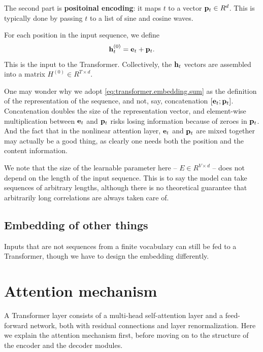 \documentclass[hyperref, a4paper, 12pt]{report}
\newcommand*{\concept}[1]{{\textbf{#1}}}
\def\mathbb#1{#1}%
\begin{document}
The second part is \concept{positoinal encoding}:
it maps $t$ to a vector $\vb{p}_t \in \mathbb{R}^d$.
This is typically done by passing $t$ to a list of sine and cosine waves.

For each position in the input sequence, we define 
\begin{equation}
    \vb{h}_t^{(0)} = \vb{e}_t + \vb{p}_t.
    \label{eq:transformer.embedding.sum}
\end{equation}
This is the input to the Transformer. Collectively, the $\vb{h}_t$ vectors are assembled into a matrix $H^{(0)} \in \mathbb{R}^{T \times d}$.

One may wonder why we adopt \eqref{eq:transformer.embedding.sum} as the definition of the representation of the sequence,
and not, say, concatenation $[\vb{e}_t ; \vb{p}_t]$.
Concatenation doubles the size of the representation vector,
and element-wise multiplication between $\vb{e}_t$ and $\vb{p}_t$ risks losing information because of zeroes in $\vb{p}_t$.
And the fact that in the nonlinear attention layer, $\vb{e}_t$ and $\vb{p}_t$ are mixed together
may actually be a good thing, as clearly one needs both the position and the content information.

We note that the size of the learnable parameter here -- $E \in \mathbb{R}^{V \times d}$ -- 
does not depend on the length of the input sequence.
This is to say the model can take sequences of arbitrary lengths,
although there is no theoretical guarantee that arbitrarily long correlations are always taken care of.

\subsection{Embedding of other things}

Inputs that are not sequences from a finite vocabulary can still be fed to a Transformer,
though we have to design the embedding differently.

\section{Attention mechanism}\label{sec:transformer.attention}

A Transformer layer consists of a multi-head self-attention layer and a feed-forward network,
both with residual connections and layer renormalization.
Here we explain the attention mechanism first, before moving on to the structure of the encoder and the decoder modules.
\end{document}
